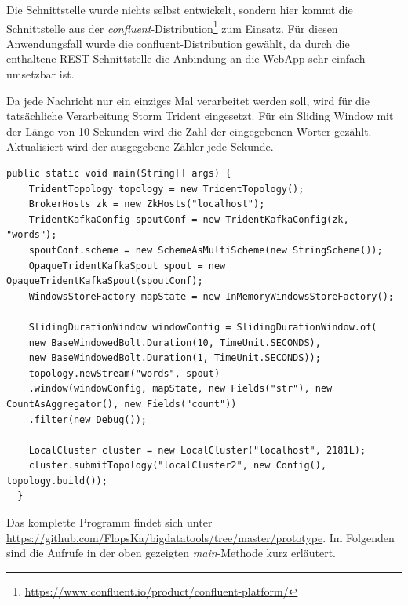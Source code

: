 \documentclass[a4paper,11pt]{scrartcl}
\begin{document}
  Die Schnittstelle wurde nichts selbst entwickelt, sondern hier kommt die
  Schnittstelle aus der
  \textit{confluent}-Distribution\footnote{\url{https://www.confluent.io/product/confluent-platform/}}
  zum Einsatz. Für diesen Anwendungsfall wurde die confluent-Distribution
  gewählt, da durch die enthaltene REST-Schnittstelle die Anbindung an die
  WebApp sehr einfach umsetzbar ist.

  Da jede Nachricht nur ein einziges Mal verarbeitet werden soll, wird
  für die tatsächliche Verarbeitung Storm Trident eingesetzt. Für ein
  Sliding Window mit der Länge von 10 Sekunden wird die Zahl der
  eingegebenen Wörter gezählt. Aktualisiert wird der ausgegebene
  Zähler jede Sekunde.

  \begin{lstlisting}[caption={Beispielimplementierung zur Ermittlung der Tippgeschwindigkeit}]
  public static void main(String[] args) {
    TridentTopology topology = new TridentTopology();
    BrokerHosts zk = new ZkHosts("localhost");
    TridentKafkaConfig spoutConf = new TridentKafkaConfig(zk, "words");
    spoutConf.scheme = new SchemeAsMultiScheme(new StringScheme());
    OpaqueTridentKafkaSpout spout = new OpaqueTridentKafkaSpout(spoutConf);
    WindowsStoreFactory mapState = new InMemoryWindowsStoreFactory();

    SlidingDurationWindow windowConfig = SlidingDurationWindow.of(
    new BaseWindowedBolt.Duration(10, TimeUnit.SECONDS),
    new BaseWindowedBolt.Duration(1, TimeUnit.SECONDS));
    topology.newStream("words", spout)
    .window(windowConfig, mapState, new Fields("str"), new CountAsAggregator(), new Fields("count"))
    .filter(new Debug());

    LocalCluster cluster = new LocalCluster("localhost", 2181L);
    cluster.submitTopology("localCluster2", new Config(), topology.build());
  }
  \end{lstlisting}

  Das komplette Programm findet sich unter
  \url{https://github.com/FlopsKa/bigdatatools/tree/master/prototype}. Im
  Folgenden sind die Aufrufe in der oben gezeigten \textit{main}-Methode kurz
  erläutert. 
\end{document}
